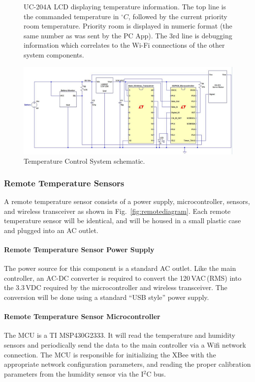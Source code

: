 \begin{figure}
\caption{UC-204A LCD displaying temperature information.  The top line is the commanded temperature in $^\circ C$, followed by the current priority room temperature.  Priority room is displayed in numeric format (the same number as was sent by the PC App).  The 3rd line is debugging information which correlates to the Wi-Fi connections of the other system components. }
\label{fig:lcd_sample}
\end{figure}




\begin{figure} [htb]
\centering
\includegraphics[width=.99\textwidth]{Temperature_Sensor.jpg}
\caption{Temperature Control System schematic.}
\label{fig:Temperature_System}
\end{figure}


\subsubsection{Remote Temperature Sensors}
A remote temperature sensor consists of a power supply, microcontroller, sensors, and wireless transceiver as shown in Fig.~\ref{fig:remotediagram}.  Each remote temperature sensor will be identical, and will be housed in a small plastic case and plugged into an AC outlet.
\paragraph{Remote Temperature Sensor Power Supply}
The power source for this component is a standard AC outlet.  Like the main controller, an AC-DC converter is required to convert the 120\,VAC\,(RMS) into the 3.3\,VDC required by the microcontroller and wireless transceiver.  The conversion will be done using a standard ``USB style'' power supply.
\paragraph{Remote Temperature Sensor Microcontroller}
The MCU is a TI MSP430G2333.  It will read the temperature and humidity sensors and periodically send the data to the main controller via a Wifi network connection.  The MCU is responsible for initializing the XBee with the appropriate network configuration parameters, and reading the proper calibration parameters from the humidity sensor via the I$^2$C bus.
